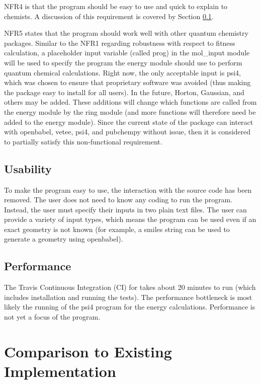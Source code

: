 \documentclass[12pt, titlepage]{article}
\begin{document}
NFR4 is that the program should be easy to use and quick to explain to 
chemists. A discussion of this requirement is covered by Section 
\ref{section-usability}.

NFR5 states that the program should work well with other quantum chemistry 
packages. Similar to the NFR1 regarding robustness with respect to fitness 
calculation, a placeholder input variable (called prog) in the mol\_input 
module will be used to specify the program the energy module should use to 
perform quantum chemical calculations. Right now, the only acceptable input is 
psi4, which was chosen to ensure that proprietary software was avoided (thus 
making the package easy to install for all users). In the future, Horton, 
Gaussian, and others may be added. These additions will change which functions 
are called from the energy module by the ring module (and more functions will 
therefore need be added to the energy module). Since the current state of the 
package can interact with openbabel, vetee, psi4, and pubchempy without issue, 
then it is considered to partially satisfy this non-functional requirement.

\subsection{Usability}\label{section-usability}

To make the program easy to use, the interaction with the source code has been 
removed. The user does not need to know any coding to run the program. Instead, 
the user must specify their inputs in two plain text files. The user can 
provide a variety of input types, which means the program can be used even if 
an exact geometry is not known (for example, a smiles string can be used to 
generate a geometry using openbabel).
		
\subsection{Performance}

The Travis Continuous Integration (CI) for \progname{} takes about 20 minutes 
to run (which includes installation and running the tests). The performance 
bottleneck is most likely the running of the psi4 program for the energy 
calculations. Performance is not yet a focus of the program.
	
\section{Comparison to Existing Implementation}	
\end{document}
